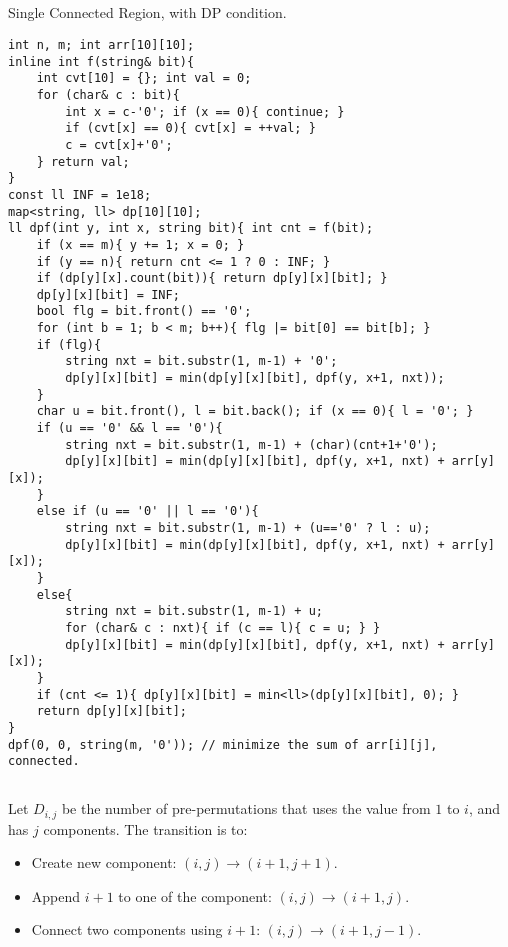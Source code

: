 \documentclass[landscape, 8pt, a4paper, oneside, twocolumn]{extarticle}
\begin{document}
\subsection{}
Single Connected Region, with DP condition.

\begin{verbatim}
int n, m; int arr[10][10];
inline int f(string& bit){
    int cvt[10] = {}; int val = 0;
    for (char& c : bit){
        int x = c-'0'; if (x == 0){ continue; }
        if (cvt[x] == 0){ cvt[x] = ++val; }
        c = cvt[x]+'0';  
    } return val;
}
const ll INF = 1e18;
map<string, ll> dp[10][10];
ll dpf(int y, int x, string bit){ int cnt = f(bit);
    if (x == m){ y += 1; x = 0; }
    if (y == n){ return cnt <= 1 ? 0 : INF; }
    if (dp[y][x].count(bit)){ return dp[y][x][bit]; }
    dp[y][x][bit] = INF;
    bool flg = bit.front() == '0';
    for (int b = 1; b < m; b++){ flg |= bit[0] == bit[b]; }
    if (flg){
        string nxt = bit.substr(1, m-1) + '0';
        dp[y][x][bit] = min(dp[y][x][bit], dpf(y, x+1, nxt));
    }
    char u = bit.front(), l = bit.back(); if (x == 0){ l = '0'; }
    if (u == '0' && l == '0'){
        string nxt = bit.substr(1, m-1) + (char)(cnt+1+'0');
        dp[y][x][bit] = min(dp[y][x][bit], dpf(y, x+1, nxt) + arr[y][x]);
    }
    else if (u == '0' || l == '0'){
        string nxt = bit.substr(1, m-1) + (u=='0' ? l : u);
        dp[y][x][bit] = min(dp[y][x][bit], dpf(y, x+1, nxt) + arr[y][x]);
    }
    else{
        string nxt = bit.substr(1, m-1) + u;
        for (char& c : nxt){ if (c == l){ c = u; } }
        dp[y][x][bit] = min(dp[y][x][bit], dpf(y, x+1, nxt) + arr[y][x]);
    }
    if (cnt <= 1){ dp[y][x][bit] = min<ll>(dp[y][x][bit], 0); }
    return dp[y][x][bit];
}
dpf(0, 0, string(m, '0')); // minimize the sum of arr[i][j], connected.
\end{verbatim}
\subsection{}
Let $D_{i,j}$ be the number of pre-permutations that uses the value from $1$ to $i$, and has $j$ components.
The transition is to:
\begin{itemize}
	\item Create new component: $(i, j) \to (i+1, j+1)$.
	\item Append $i+1$ to one of the component: $(i, j) \to (i+1, j)$.
	\item Connect two components using $i+1$: $(i, j) \to (i+1, j-1)$.
\end{itemize}
\end{document}
